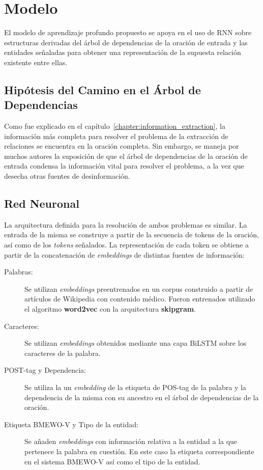 \section{Modelo}\label{sec:model}

El modelo de aprendizaje profundo propuesto se apoya en el uso de RNN sobre estructuras derivadas del árbol de dependencias de la oración de entrada y las entidades señaladas para obtener una representación de la supuesta relación existente entre ellas.

\subsection{Hipótesis del Camino en el Árbol de Dependencias}

Como fue explicado en el capítulo~\ref{chapter:information_extraction}, la información más completa para resolver el problema de la extracción de relaciones se encuentra en la oración completa. Sin embargo, se maneja por muchos autores la suposición de que el árbol de dependencias de la oración de entrada condensa la información vital para resolver el problema, a la vez que desecha otras fuentes de desinformación.

\subsection{Red Neuronal}

La arquitectura definida para la resolución de ambos problemas es similar. 
La entrada de la misma se construye a partir de la secuencia de tokens de la oración, así como de los \textit{tokens} señalados.
La representación de cada token se obtiene a partir de la concatenación de \textit{embeddings} de distintas fuentes de información:

\begin{description}
	\item[Palabras:] Se utilizan \textit{embeddings} preentrenados en un corpus construido a partir de artículos de Wikipedia con contenido médico.
	Fueron entrenados utilizado el algoritmo \textbf{word2vec}\cite{word2vec} con la arquitectura \textbf{skipgram}.
	
	\item[Caracteres:] Se utilizan \textit{embeddings} obtenidos mediante una capa BiLSTM sobre los caracteres de la palabra.
	
	\item[POST-tag y Dependencia:] Se utiliza la un \textit{embedding} de la etiqueta de POS-tag de la palabra y la dependencia de la misma con su ancestro en el árbol de dependencias de la oración.
	
	\item[Etiqueta BMEWO-V y Tipo de la entidad:] Se añaden \textit{embeddings} con información relativa a la entidad a la que pertenece la palabra en cuestión.
	En este caso la etiqueta correspondiente en el sistema BMEWO-V así como el tipo de la entidad.
	
\end{description}

